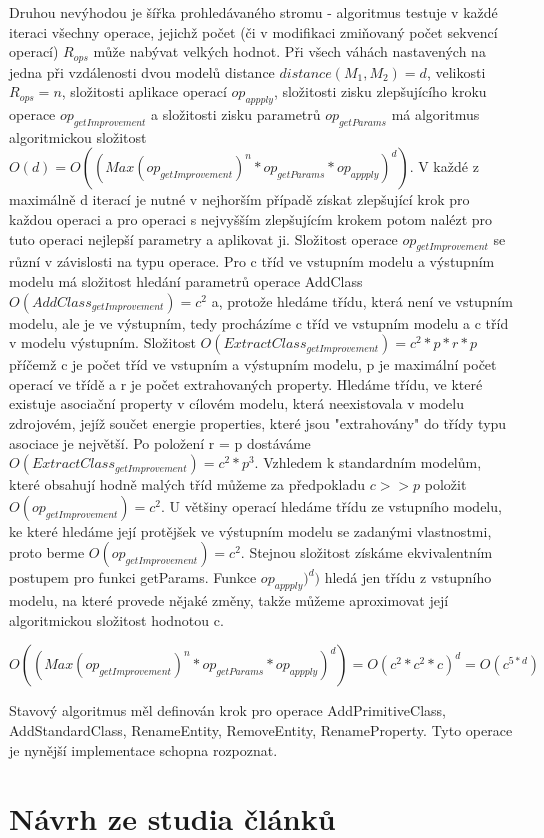 \documentclass[11pt,twoside,a4paper]{book}
\begin{document}
Druhou nevýhodou je šířka prohledávaného stromu - algoritmus testuje v každé
iteraci všechny operace, jejichž počet (či v modifikaci zmiňovaný počet
sekvencí operací) $R_{ops}$ může nabývat velkých hodnot. Při všech váhách
nastavených na jedna při vzdálenosti dvou modelů distance $distance(M_1,M_2) =
d$, velikosti $R_{ops} = n$, složitosti aplikace operací $op_{appply}$,
složitosti zisku zlepšujícího kroku operace $op_{getImprovement}$ a složitosti
zisku parametrů $op_{getParams}$ má algoritmus algoritmickou složitost $O(d) =
O((Max(op_{getImprovement})^n * op_{getParams} * op_{appply})^d)$. V každé z
maximálně d iterací je nutné v nejhorším případě získat zlepšující krok pro
každou operaci a pro operaci s nejvyšším zlepšujícím krokem potom nalézt pro
tuto operaci nejlepší parametry a aplikovat ji. Složitost operace
$op_{getImprovement}$ se různí v závislosti na typu operace. Pro c tříd ve
vstupním modelu a výstupním modelu má složitost hledání parametrů operace
AddClass $O(AddClass_{getImprovement})= c^2$ a, protože hledáme třídu, která
není ve vstupním modelu, ale je ve výstupním, tedy procházíme c tříd ve
vstupním modelu a c tříd v modelu výstupním. Složitost
$O(ExtractClass_{getImprovement})= c^2 * p * r * p $ příčemž c je počet tříd ve
vstupním a výstupním modelu, p je maximální počet operací ve třídě a r je počet
extrahovaných property. Hledáme třídu, ve které existuje asociační property v
cílovém modelu, která neexistovala v modelu zdrojovém, jejíž součet energie
properties, které jsou "extrahovány" do třídy typu asociace je největší.
Po položení r = p dostáváme $O(ExtractClass_{getImprovement})= c^2 * p^3 $.
Vzhledem k standardním modelům, které obsahují hodně malých tříd můžeme za
předpokladu $c >> p$ položit $O(op_{getImprovement})= c^2$. U většiny
operací hledáme třídu ze vstupního modelu, ke které hledáme její protějšek ve
výstupním modelu se zadanými vlastnostmi, proto berme $O(op_{getImprovement})= c^2$. Stejnou
složitost získáme ekvivalentním postupem pro funkci getParams.
Funkce $op_{appply})^d)$ hledá jen třídu z vstupního modelu, na které
provede nějaké změny, takže můžeme aproximovat její algoritmickou složitost
hodnotou c.

$O((Max(op_{getImprovement})^n * op_{getParams} * op_{appply})^d) = O(c^2 * c^2
* c)^d = O(c^{5*d})$

Stavový algoritmus měl definován krok pro operace AddPrimitiveClass,
AddStandardClass, RenameEntity, RemoveEntity, RenameProperty. Tyto operace
je nynější implementace schopna rozpoznat.
 
 \section{Návrh ze studia článků}
 
\end{document}
